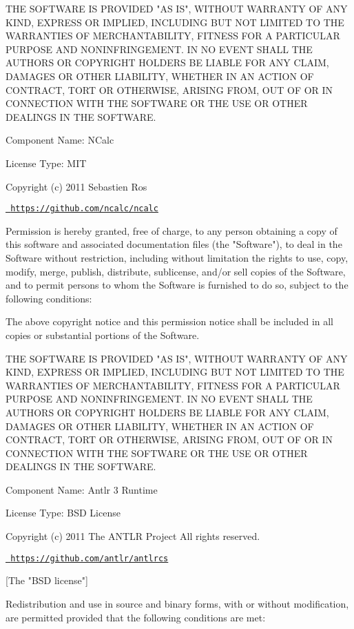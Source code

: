 THE SOFTWARE IS PROVIDED "{}\+AS IS"{}, WITHOUT WARRANTY OF ANY KIND, EXPRESS OR IMPLIED, INCLUDING BUT NOT LIMITED TO THE WARRANTIES OF MERCHANTABILITY, FITNESS FOR A PARTICULAR PURPOSE AND NONINFRINGEMENT. IN NO EVENT SHALL THE AUTHORS OR COPYRIGHT HOLDERS BE LIABLE FOR ANY CLAIM, DAMAGES OR OTHER LIABILITY, WHETHER IN AN ACTION OF CONTRACT, TORT OR OTHERWISE, ARISING FROM, OUT OF OR IN CONNECTION WITH THE SOFTWARE OR THE USE OR OTHER DEALINGS IN THE SOFTWARE.

 Component Name\+: NCalc

License Type\+: MIT

Copyright (c) 2011 Sebastien Ros

\href{https://github.com/ncalc/ncalc}{\texttt{ https\+://github.\+com/ncalc/ncalc}}

Permission is hereby granted, free of charge, to any person obtaining a copy of this software and associated documentation files (the "{}\+Software"{}), to deal in the Software without restriction, including without limitation the rights to use, copy, modify, merge, publish, distribute, sublicense, and/or sell copies of the Software, and to permit persons to whom the Software is furnished to do so, subject to the following conditions\+:

The above copyright notice and this permission notice shall be included in all copies or substantial portions of the Software.

THE SOFTWARE IS PROVIDED "{}\+AS IS"{}, WITHOUT WARRANTY OF ANY KIND, EXPRESS OR IMPLIED, INCLUDING BUT NOT LIMITED TO THE WARRANTIES OF MERCHANTABILITY, FITNESS FOR A PARTICULAR PURPOSE AND NONINFRINGEMENT. IN NO EVENT SHALL THE AUTHORS OR COPYRIGHT HOLDERS BE LIABLE FOR ANY CLAIM, DAMAGES OR OTHER LIABILITY, WHETHER IN AN ACTION OF CONTRACT, TORT OR OTHERWISE, ARISING FROM, OUT OF OR IN CONNECTION WITH THE SOFTWARE OR THE USE OR OTHER DEALINGS IN THE SOFTWARE.

 Component Name\+: Antlr 3 Runtime

License Type\+: BSD License

Copyright (c) 2011 The ANTLR Project All rights reserved.

\href{https://github.com/antlr/antlrcs}{\texttt{ https\+://github.\+com/antlr/antlrcs}}

\mbox{[}The "{}\+BSD license"{}\mbox{]}

Redistribution and use in source and binary forms, with or without modification, are permitted provided that the following conditions are met\+:


